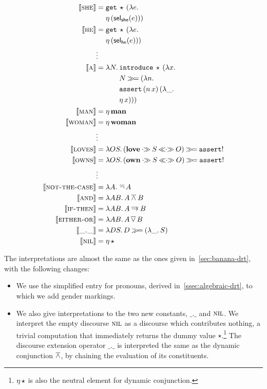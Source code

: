 \begin{align*}
  \lex{she}{\begin{aligned}[t]
      &\app{\op{get}}{\star}{(\lam{e}{ \\
      &\etaE{(\selshe(e))}})}
    \end{aligned}} \\
  \lex{he}{\begin{aligned}[t]
      &\app{\op{get}}{\star}{(\lam{e}{ \\
      &\etaE{(\selhe(e))}})}
    \end{aligned}} \\
  &\vdots \\
  \lex{a}{\begin{aligned}[t]
      \lam{N}{&\app{\op{introduce}}{\star}{(\lam{x}{ \\
              &N \hsbind (\lam {n}{ \\
              &\app{\op{assert}}{(\ap{n}{x})}{(\lam{\_}{ \\
              &\etaE{x}})}})})}}
    \end{aligned}} \\
  \lex{man}{\etaE{\obj{man}}} \\
  \lex{woman}{\etaE{\obj{woman}}} \\
  &\vdots \\
  \lex{loves}{\lam{O S}{(\obj{love} \apr S \aplr O) \hsbind \op{assert}!}} \\
  \lex{owns}{\lam{O S}{(\obj{own} \apr S \aplr O) \hsbind \op{assert}!}} \\
  &\vdots \\
  \lex{not-the-case}{\lam{A}{\dnot A}} \\
  \lex{and}{\lam{A B}{A \dand B}} \\
  \lex{if-then}{\lam{A B}{A \dimp B}} \\
  \lex{either-or}{\lam{A B}{A \dor B}} \\
  \lex{\_.\_}{\lam{D S}{D \hsbind (\lam{\_}{S})}} \\
  \lex{nil}{\etaE{\star}}
\end{align*}

The interpretations are almost the same as the ones given
in~\ref{sec:banana-drt}, with the following changes:

\begin{itemize}
\item We use the simplified entry for pronouns, derived
  in~\ref{ssec:algebraic-drt}, to which we add gender markings.
\item We also give interpretations to the two new constants, $\_.\_$ and
  $\textsc{nil}$. We interpret the empty discourse $\textsc{nil}$ as a discourse
  which contributes nothing, a trivial computation that immediately returns
  the dummy value $\star$.\footnote{$\eta\,\star$ is also the neutral
    element for dynamic conjunction.} The discourse extension operator
  $\_.\_$ is interpreted the same as the dynamic conjunction $\mathbin{\overline{\land}}$, by
  chaining the evaluation of its constituents.
\end{itemize}

